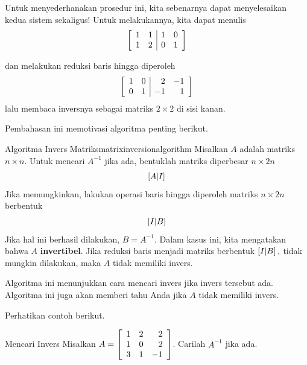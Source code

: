 Untuk menyederhanakan prosedur ini, kita sebenarnya dapat menyelesaikan kedua sistem sekaligus!
Untuk melakukannya, kita dapat menulis
\begin{equation*}
\left[
\begin{array}{rr|rr}
1 & 1 & 1 & 0 \\
1 & 2 & 0 & 1
\end{array}
\right]
\end{equation*}

dan melakukan reduksi baris hingga diperoleh
\begin{equation*}
\left[
\begin{array}{rr|rr}
1 & 0 & 2 & -1 \\
0 & 1 & -1 & 1
\end{array}
\right]
\end{equation*}
lalu membaca inversnya sebagai matriks $2\times 2$ di sisi kanan.

Pembahasan ini memotivasi algoritma penting berikut.

\begin{algorithm}{Algoritma Invers Matriks}{matrixinversionalgorithm}
Misalkan $A$ adalah matriks $n\times n$.  Untuk mencari $A^{-1}$ jika ada, bentuklah
matriks diperbesar $n\times 2n$
\begin{equation*}
\left[ A|I\right]
\end{equation*}
Jika memungkinkan, lakukan operasi baris hingga diperoleh matriks $n\times 2n$
berbentuk
\begin{equation*}
\left[ I|B\right]  
\end{equation*}
Jika hal ini berhasil dilakukan, $B=A^{-1}.$ Dalam kasus ini, kita mengatakan bahwa $A$ \textbf{invertibel}.
Jika reduksi baris menjadi
matriks berbentuk $\left[ I|B\right] ,$ tidak mungkin dilakukan, maka $A$ tidak memiliki invers.
\end{algorithm}

Algoritma ini menunjukkan cara mencari invers jika invers tersebut ada. Algoritma ini juga akan memberi tahu Anda jika
$A$ tidak memiliki invers. 

Perhatikan contoh berikut.

\begin{example}{Mencari Invers}\label{exa:findinginverse}
Misalkan $A=\left[
\begin{array}{rrr}
1 & 2 & 2 \\
1 & 0 & 2 \\
3 & 1 & -1
\end{array}
\right] $. Carilah $A^{-1}$ jika ada.
\end{example}

